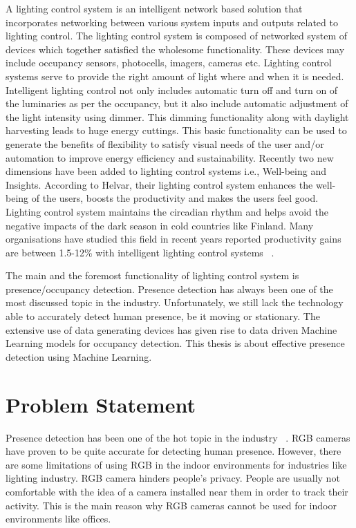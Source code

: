 A lighting control system is an intelligent network based solution that incorporates networking between various system inputs and outputs related to lighting control. The lighting control system is composed of networked system of devices which together satisfied the wholesome functionality. These devices may include occupancy sensors, photocells, imagers, cameras etc. Lighting control systems serve to provide the right amount of light where and when it is needed. Intelligent lighting control not only includes automatic turn off and turn on of the luminaries as per the occupancy, but it also include automatic adjustment of the light intensity using dimmer. This dimming functionality along with daylight harvesting leads to huge energy cuttings. This basic functionality can be used to generate the benefits of flexibility to satisfy visual needs of the user and/or automation to improve energy efficiency and sustainability. Recently two new dimensions have been added to lighting control systems i.e., Well-being and Insights. 
According to Helvar, their lighting control system enhances the well-being of the users, boosts the productivity and makes the users feel good. Lighting control system maintains the circadian rhythm and helps avoid the negative impacts of the dark season in cold countries like Finland. Many organisations have studied this field in recent years reported productivity gains are between 1.5-12\% with intelligent lighting control systems ~\cite{helvar_wellbeing}.


The main and the foremost functionality of lighting control system is presence/occupancy detection. Presence detection has always been one of the most discussed topic in the industry. Unfortunately, we still lack the technology able to accurately detect human presence, be it moving or stationary. The extensive use of data generating devices has given rise to data driven Machine Learning models for occupancy detection. This thesis is about effective presence detection using Machine Learning.

\section{Problem Statement}

Presence detection has been one of the hot topic in the industry ~\cite{heikorothe2019}. RGB cameras have proven to be quite accurate for detecting human presence. However, there are some limitations of using RGB in the indoor environments for industries like lighting industry. RGB camera hinders people's privacy. People are usually not comfortable with the idea of a camera installed near them in order to track their activity. This is the main reason why RGB cameras cannot be used for indoor environments like offices.

